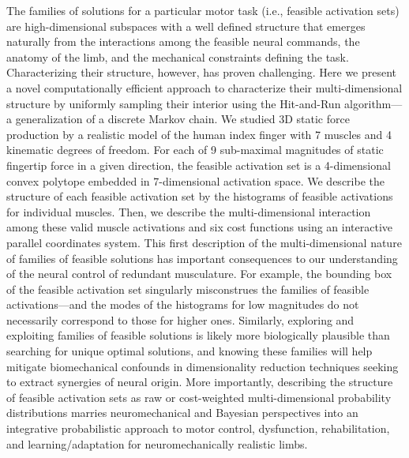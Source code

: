 The families of solutions for a particular motor task  (i.e., feasible activation sets) are high-dimensional subspaces with a well defined structure that emerges naturally from the interactions among the feasible neural commands, the anatomy of the limb, and the mechanical constraints defining the task.
Characterizing their structure, however, has proven challenging.
Here we present a novel computationally efficient approach to characterize their multi-dimensional structure by uniformly sampling their interior using the Hit-and-Run algorithm---a generalization of a discrete Markov chain.
We studied 3D static force production by a realistic model of the human index finger with 7 muscles and 4 kinematic degrees of freedom.
For each of 9 sub-maximal magnitudes of static fingertip force in a given direction, the feasible activation set is a 4-dimensional convex polytope  embedded in 7-dimensional activation space.
We describe the structure of each feasible activation set by the histograms of feasible activations for individual muscles.  Then, we describe the multi-dimensional interaction among these valid muscle activations and six cost functions using an interactive parallel coordinates system. 
This first description of the multi-dimensional nature of families of feasible solutions  has important consequences to our understanding of the neural control of redundant musculature.  For example, the bounding box of the feasible activation set singularly misconstrues the families of feasible activations—and the modes of the histograms for low magnitudes do not necessarily correspond to those for higher ones. Similarly, exploring and exploiting families of feasible solutions is likely more biologically plausible than searching for unique optimal solutions, and knowing these families will help mitigate biomechanical confounds in dimensionality reduction techniques seeking to extract synergies of neural origin.
More importantly, describing the structure of feasible activation sets as raw or cost-weighted multi-dimensional probability distributions marries neuromechanical and Bayesian perspectives into an integrative probabilistic approach to motor control, dysfunction, rehabilitation, and learning/adaptation for neuromechanically realistic limbs.